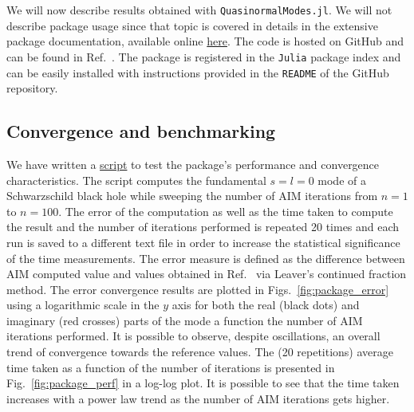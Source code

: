 We will now describe results obtained with \texttt{QuasinormalModes.jl}. We will not describe package usage since that topic is covered in details in the extensive package documentation, available online \href{https://lucass-carneiro.github.io/QuasinormalModes.jl/stable/}{here}. The code is hosted on GitHub and can be found in Ref.~\cite{QuasinormalModesRepo}. The package is registered in the \texttt{Julia} package index and can be easily installed with instructions provided in the \texttt{README} of the GitHub repository.

\subsection{Convergence and benchmarking}

We have written a \href{https://github.com/lucass-carneiro/QuasinormalModes.jl/tree/master/benchmark}{script} to test the package's performance and convergence characteristics. The script computes the fundamental $s=l=0$ mode of a Schwarzschild black hole while sweeping the number of AIM iterations from $n=1$ to $n=100$. The error of the computation as well as the time taken to compute the result and the number of iterations performed is repeated 20 times and each run is saved to a different text file in order to increase the statistical significance of the time measurements. The error measure is defined as the difference between AIM computed value and values obtained in Ref.~\cite{BertiQNMData} via Leaver's continued fraction method. The error convergence results are plotted in Figs.~\ref{fig:package_error} using a logarithmic scale in the $y$ axis for both the real (black dots) and imaginary (red crosses) parts of the mode a function the number of AIM iterations performed. It is possible to observe, despite oscillations, an overall trend of convergence towards the reference values. The (20 repetitions) average time taken as a function of the number of iterations is presented in Fig.~\ref{fig:package_perf} in a log-log plot. It is possible to see that the time taken increases with a power law trend as the number of AIM iterations gets higher.

